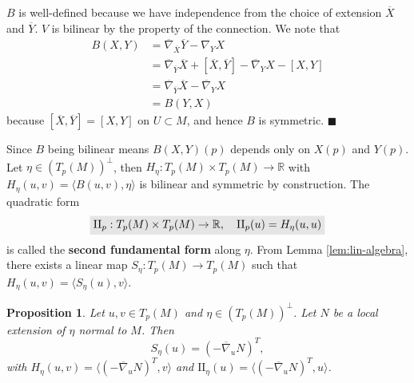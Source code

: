 \documentclass[letter-paper]{tufte-book}
\newtheorem{proposition}[theorem]{\color{pastel-blue}Proposition}
\newenvironment{proof}[1][Proof]{\begin{trivlist}
\item[\hskip \labelsep {\bfseries #1}]}{\end{trivlist}}
\newcommand{\qed}{\hfill$\blacksquare$}
\newcommand{\highlight}[1]{\mathchoice%
  {\colorbox{black!10}{$\displaystyle#1$}}%
  {\colorbox{black!10}{$\textstyle#1$}}%
  {\colorbox{black!10}{$\scriptstyle#1$}}%
  {\colorbox{black!10}{$\scriptscriptstyle#1$}}}%
\begin{document}
\begin{proof}
  $B$ is well-defined because we have independence from the choice of extension $\overline{X}$ and $\overline{Y}$. $V$ is bilinear by the property of the connection. We note that
  \begin{align*}
    B(X,Y) 
      &= \overline{\nabla}_{\overline{X}}\overline{Y} - \nabla_Y X\\
      &= \overline{\nabla}_{\overline{Y}}\overline{X} + [\overline{X}, \overline{Y}] - \overline{\nabla}_Y X - [X,Y]\\
      &= \overline{\nabla}_{\overline{Y}}\overline{X} - \overline{\nabla}_Y X\\
      &= B(Y,X)
  \end{align*}
  because $[\overline{X}, \overline{Y}] = [X, Y]$ on $U\subset M$, and hence $B$ is symmetric. \qed
\end{proof}

Since $B$ being bilinear means $B(X,Y)(p)$ depends only on $X(p)$ and $Y(p)$. Let $\eta \in (T_p(M))^\perp$, then $H_\eta: T_p(M) \times T_p(M) \to \mathbb{R}$ with $H_\eta(u,v) = \langle B(u,v), \eta\rangle$ is bilinear and symmetric by construction. The quadratic form
\begin{equation}
  \highlight{\mbox{II}_p: T_p(M)\times T_p(M) \to \mathbb{R}, \quad \mbox{II}_p(u) = H_\eta(u,u)}
\end{equation}
is called the \textbf{second fundamental form} along $\eta$. From Lemma \ref{lem:lin-algebra}, there exists a linear map $S_\eta: T_p(M) \to T_p(M)$ such that $H_\eta(u,v) = \langle S_\eta(u), v\rangle$.

\begin{proposition}
  Let $u,v\in T_p(M)$ and $\eta\in (T_p(M))^\perp$. Let $N$ be a local extension of $\eta$ normal to $M$. Then
  \begin{equation}
    S_\eta(u) = (-\overline{\nabla}_u N)^T,
  \end{equation}
  with $H_\eta(u,v) = \langle (-\overline{\nabla}_u N)^T, v\rangle$ and $\mbox{II}_\eta(u) = \langle (-\overline{\nabla}_u N)^T, u\rangle$.
\end{proposition}
\end{document}
